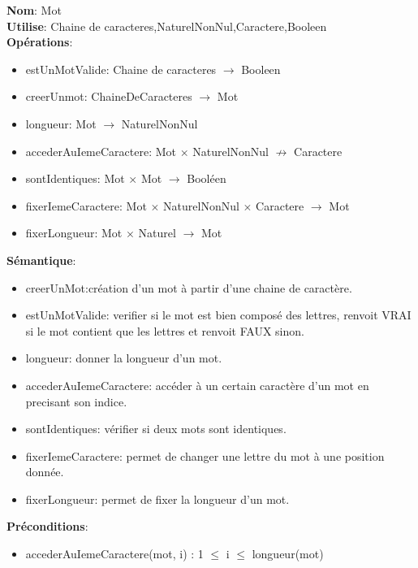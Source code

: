 \documentclass{article}
\begin{document}
    \noindent
    \textbf{Nom}: Mot \\
    \textbf{Utilise}: Chaine de caracteres,NaturelNonNul,Caractere,Booleen \\
    \textbf{Opérations}: \begin{itemize}[label=$\ $, leftmargin=2cm, itemsep=0cm]
        \item estUnMotValide: Chaine de caracteres $\rightarrow $ Booleen
        \item creerUnmot: ChaineDeCaracteres $ \rightarrow$ Mot
        \item longueur: Mot $ \rightarrow$  NaturelNonNul
        \item accederAuIemeCaractere: Mot $ \times $ NaturelNonNul $ \nrightarrow$  Caractere
        \item sontIdentiques: Mot $ \times $ Mot $ \rightarrow$  Booléen
        \item fixerIemeCaractere:  Mot $ \times $ NaturelNonNul $ \times $ Caractere $ \rightarrow$ Mot
        \item fixerLongueur: Mot $ \times $ Naturel $ \rightarrow$ Mot
    \end{itemize}
    
    \textbf{Sémantique}: \begin{itemize}[label=$\- $, leftmargin=2cm, itemsep=0cm]
      \item creerUnMot:création d’un mot à partir d’une chaine de caractère.
        \item estUnMotValide: verifier si le mot est bien composé des lettres, renvoit VRAI si le mot contient que les lettres et renvoit FAUX sinon.
        \item longueur: donner la longueur d’un mot.
        \item accederAuIemeCaractere: accéder à un certain caractère d'un mot en precisant son indice.
         \item sontIdentiques: vérifier si deux mots sont identiques.
         \item fixerIemeCaractere: permet de changer une lettre du mot à une position donnée. 
         \item fixerLongueur: permet de fixer la longueur d'un mot.
    \end{itemize}

    \textbf{Préconditions}: \begin{itemize}[label=$\- $, leftmargin=2cm, itemsep=0cm]
        \item accederAuIemeCaractere(mot, i) : 1 $\leq$ i $\leq$ longueur(mot)
    \end{itemize}
\end{document}
